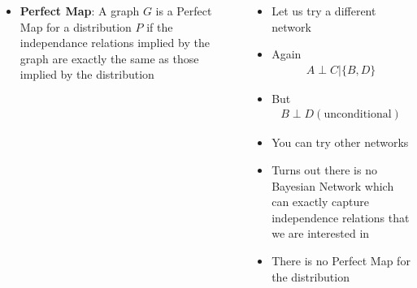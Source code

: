 \begin{frame}
	\begin{columns}
		\begin{overlayarea}{\textwidth}{\textheight}
		\vspace{0.1in}
		\begin{center}
		\end{center}
		\begin{itemize}\justifying
			\item<7-> \textbf{Perfect Map}: A graph $G$ is a Perfect Map for a distribution
			$P$ if the independance relations implied by the graph are exactly the same as those
			implied by the distribution
		\end{itemize}
		\end{overlayarea}
		\begin{overlayarea}{\textwidth}{\textheight}
			\begin{itemize}\justifying
			\item <1-> Let us try a different network
			\item <3-> Again 
			\begin{align*}
			A \perp C | \{B,D\}
			 \end{align*}
			\item <4-> But 
			\begin{align*}
			B \perp D  (\text{unconditional})
			\end{align*}
			\item <5-> You can try other networks 
			\item <6-> Turns out there is no Bayesian Network which can exactly capture independence relations that we are interested in
			\item <8-> There is no Perfect Map for the distribution 
			\end{itemize}
		\end{overlayarea}
	\end{columns}
\end{frame}

